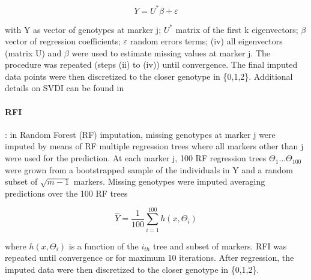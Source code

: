 \begin{equation}
\label{eq:SVDI_regression}
Y = U^*\beta +\varepsilon 
\end{equation}

with Y as vector of genotypes at marker j; $U^*$ matrix of the first k eigenvectors; $\beta$ vector of regression coefficients; $\varepsilon$ random errors terms; (iv) all eigenvectors (matrix U) and $\beta$ were used to estimate missing values at marker j. The procedure was repeated (steps (ii) to (iv)) until convergence. The final imputed data points were then discretized to the closer genotype in \{0,1,2\}. Additional details on SVDI can be found in \cite{troyanskaya_missing_2001}

\paragraph{RFI}
\label{par:RFI}
: in Random Forest (RF) imputation, missing genotypes at marker j were imputed by means of RF multiple regression trees \cite{breiman_random_2001} where all markers other than j were used for the prediction. At each marker j, 100 RF regression trees $\Theta_{1} \ldots \Theta_{100}$ were grown from a bootstrapped sample of the individuals in Y and a random subset of $\sqrt{m-1}$ markers. Missing genotypes were imputed averaging predictions over the 100 RF trees

\begin{equation}
\label{eq:RFI_regression}
\hat{Y} = \frac{1}{100}\sum_{i=1}^{100} h(x,\Theta_i)
\end{equation}

where $h(x,\Theta_i)$ is a function of the $i_{th}$ tree and subset of markers. RFI was repeated until convergence or for maximum 10 iterations. After regression, the imputed data were then discretized to the closer genotype in \{0,1,2\}. 

